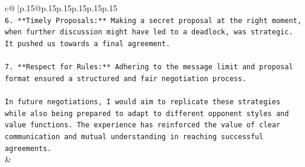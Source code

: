 \documentclass{article}
\begin{document}
{\begin{supertabular}{c@{$\;$}|p{.15\linewidth}@{}p{.15\linewidth}p{.15\linewidth}p{.15\linewidth}p{.15\linewidth}p{.15\linewidth}}
{{{\\ 
\texttt{6. **Timely Proposals:** Making a secret proposal at the right moment, when further discussion might have led to a deadlock, was strategic. It pushed us towards a final agreement.} \\
\\ 
\texttt{7. **Respect for Rules:** Adhering to the message limit and proposal format ensured a structured and fair negotiation process.} \\
\\ 
\texttt{In future negotiations, I would aim to replicate these strategies while also being prepared to adapt to different opponent styles and value functions. The experience has reinforced the value of clear communication and mutual understanding in reaching successful agreements.} \\
            }
        }
    }
    & \\ \\


\end{supertabular}}
\end{document}
